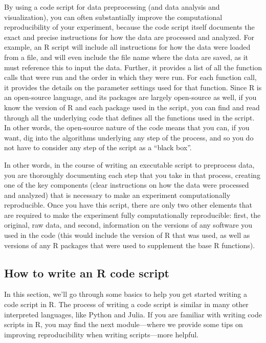 \documentclass[]{tufte-book}
\begin{document}
By using a code script for data preprocessing (and data analysis and
visualization), you can often substantially improve the computational
reproducibility of your experiment, because the code script itself documents the
exact and precise instructions for how the data are processed and analyzed. For
example, an R script will include all instructions for how the data were loaded
from a file, and will even include the file name where the data are saved, as it
must reference this to input the data. Further, it provides a list of all the
function calls that were run and the order in which they were run. For each
function call, it provides the details on the parameter settings used for that
function. Since R is an open-source language, and its packages are largely
open-source as well, if you know the version of R and each package used in the
script, you can find and read through all the underlying code that defines all
the functions used in the script. In other words, the open-source nature of the
code means that you can, if you want, dig into the algorithms underlying any
step of the process, and so you do not have to consider any step of the script
as a ``black box''.

In other words, in the course of writing an executable script to preprocess
data, you are thoroughly documenting each step that you take in that process,
creating one of the key components (clear instructions on how the data were
processed and analyzed) that is necessary to make an experiment computationally
reproducible. Once you have this script, there are only two other elements
that are required to make the experiment fully computationally reproducible:
first, the original, raw data, and second, information on the versions of
any software you used in the code (this would include the version of R that
was used, as well as versions of any R packages that were used to
supplement the base R functions).

\subsection{How to write an R code script}\label{how-to-write-an-r-code-script}

In this section, we'll go through some basics to help you get started writing a
code script in R. The process of writing a code script is similar in many other
interpreted languages, like Python and Julia. If you are familiar with writing
code scripts in R, you may find the next module---where we provide some tips on
improving reproducibility when writing scripts---more helpful.
\end{document}
